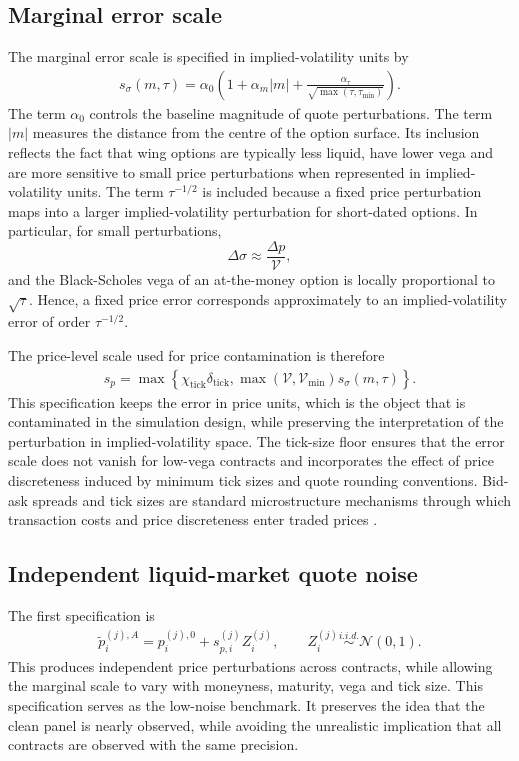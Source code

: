 \documentclass[11pt,a4paper,notitlepage]{article}
\numberwithin{equation}{section}
\begin{document}
\subsection{Marginal error scale}
The marginal error scale is specified in implied-volatility units by
\begin{align}
s_\sigma(m,\tau)
=
\alpha_0\left(
1+\alpha_m |m|
+\frac{\alpha_\tau}{\sqrt{\max(\tau,\tau_{\min})}}
\right).
\label{eq:app_iv_error_scale}
\end{align}
The term $\alpha_0$ controls the baseline magnitude of quote perturbations. The term $|m|$ measures the distance
from the centre of the option surface. Its inclusion reflects the fact that wing options are typically less liquid,
have lower vega and are more sensitive to small price perturbations when represented in implied-volatility units.
The term $\tau^{-1/2}$ is included because a fixed price perturbation maps into a larger implied-volatility
perturbation for short-dated options. In particular, for small perturbations,
\[
\Delta\sigma \approx \frac{\Delta p}{\mathcal{V}},
\]
and the Black-Scholes vega of an at-the-money option is locally proportional to $\sqrt{\tau}$. Hence, a fixed
price error corresponds approximately to an implied-volatility error of order $\tau^{-1/2}$.

The price-level scale used for price contamination is therefore
\begin{align}
s_p
=
\max\left\{
\chi_{\mathrm{tick}}\delta_{\mathrm{tick}},
\max(\mathcal{V},\mathcal{V}_{\min})s_\sigma(m,\tau)
\right\}.
\label{eq:app_price_error_scale}
\end{align}
This specification keeps the error in price units, which is the object that is contaminated in the simulation
design, while preserving the interpretation of the perturbation in implied-volatility space. The tick-size floor
ensures that the error scale does not vanish for low-vega contracts and incorporates the effect of price discreteness
induced by minimum tick sizes and quote rounding conventions. Bid-ask spreads and tick sizes are standard
microstructure mechanisms through which transaction costs and price discreteness enter traded prices
\citep{demsetz1968cost}.

\subsection{Independent liquid-market quote noise}
The first specification is
\begin{align}
\tilde p_i^{(j),A}
=
p_i^{(j),0}+s_{p,i}^{(j)}Z_i^{(j)},
\qquad
Z_i^{(j)}\overset{i.i.d.}{\sim}\mathcal{N}(0,1).
\label{eq:app_liquid_noise}
\end{align}
This produces independent price perturbations across contracts, while allowing the marginal scale to vary with
moneyness, maturity, vega and tick size. This specification serves as the low-noise benchmark. It preserves the
idea that the clean panel is nearly observed, while avoiding the unrealistic implication that all contracts are
observed with the same precision.
\end{document}
